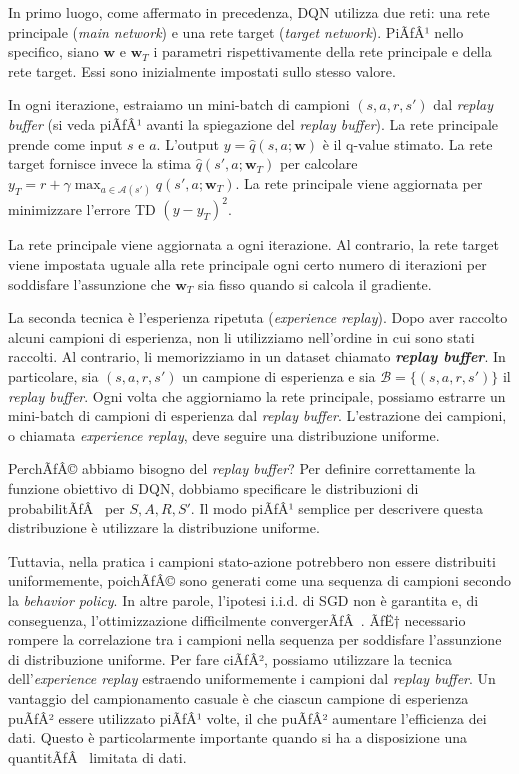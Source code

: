 ﻿\documentclass[11pt, a4paper]{report}
\begin{document}
In primo luogo, come affermato in precedenza, DQN utilizza due reti: una rete principale (\emph{main network}) e una rete target (\emph{target network}). PiÃƒÂ¹ nello specifico, siano $\bm{w}$ e $\bm{w}_T$ i parametri rispettivamente della rete principale e della rete target. Essi sono inizialmente impostati sullo stesso valore.

In ogni iterazione, estraiamo un mini-batch di campioni $(s, a, r, s')$ dal \emph{replay buffer} (si veda piÃƒÂ¹ avanti la spiegazione del \emph{replay buffer}). La rete principale prende come input $s$ e $a$. L'output $y = \hat{q}(s, a; \bm{w})$ è il q-value stimato. La rete target fornisce invece la stima $\hat{q}(s', a; \bm{w}_T)$ per calcolare $y_T = r + \gamma \max_{a \in \mathcal{A}(s')} q(s', a; \bm{w}_T)$. La rete principale viene aggiornata per minimizzare l'errore TD $(y - y_T)^2$.

La rete principale viene aggiornata a ogni iterazione. Al contrario, la rete target viene impostata uguale alla rete principale ogni certo numero di iterazioni per soddisfare l'assunzione che $\bm{w}_T$ sia fisso quando si calcola il gradiente.

La seconda tecnica è l'esperienza ripetuta (\emph{experience replay}). Dopo aver raccolto alcuni campioni di esperienza, non li utilizziamo nell'ordine in cui sono stati raccolti. Al contrario, li memorizziamo in un dataset chiamato \textbf{\emph{replay buffer}}. In particolare, sia $(s, a, r, s')$ un campione di esperienza e sia $\mathcal{B} = \{(s, a, r, s')\}$ il \emph{replay buffer}. Ogni volta che aggiorniamo la rete principale, possiamo estrarre un mini-batch di campioni di esperienza dal \emph{replay buffer}. L'estrazione dei campioni, o chiamata \emph{experience replay}, deve seguire una distribuzione uniforme.

PerchÃƒÂ© abbiamo bisogno del \emph{replay buffer}? Per definire correttamente la funzione obiettivo di DQN, dobbiamo specificare le distribuzioni di probabilitÃƒÂ  per $S, A, R, S'$. Il modo piÃƒÂ¹ semplice per descrivere questa distribuzione è utilizzare la distribuzione uniforme.

Tuttavia, nella pratica i campioni stato-azione potrebbero non essere distribuiti uniformemente, poichÃƒÂ© sono generati come una sequenza di campioni secondo la \emph{behavior policy}. In altre parole, l'ipotesi i.i.d. di SGD non è garantita e, di conseguenza, l'ottimizzazione difficilmente convergerÃƒÂ . ÃƒË† necessario rompere la correlazione tra i campioni nella sequenza per soddisfare l'assunzione di distribuzione uniforme. Per fare ciÃƒÂ², possiamo utilizzare la tecnica dell'\emph{experience replay} estraendo uniformemente i campioni dal \emph{replay buffer}. Un vantaggio del campionamento casuale è che ciascun campione di esperienza puÃƒÂ² essere utilizzato piÃƒÂ¹ volte, il che puÃƒÂ² aumentare l'efficienza dei dati. Questo è particolarmente importante quando si ha a disposizione una quantitÃƒÂ  limitata di dati.
\end{document}
